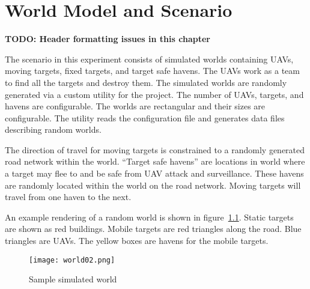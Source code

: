 \chapter{World Model and Scenario}
\label{chap:worldScenModel}
\textbf{TODO: Header formatting issues in this chapter}

The scenario in this experiment consists of simulated worlds containing UAVs, moving targets, fixed targets, and target safe havens.  The UAVs work as a team to find all the targets and destroy them.  The simulated worlds are randomly generated via a custom utility for the project.  The number of UAVs, targets, and havens are configurable.  The worlds are rectangular and their sizes are configurable.  The utility reads the configuration file and generates data files describing random worlds.  


The direction of travel for moving targets is constrained to a randomly generated road network within the world.  ``Target safe havens'' are locations in world where a target may flee to and be safe from UAV attack and surveillance.  These havens are randomly located within the world on the road network.  Moving targets will travel from one haven to the next.

An example rendering of a random world is shown in figure~\ref{fig:sample_world}. Static targets are shown as red buildings.  Mobile targets are red triangles along the road.  Blue triangles are UAVs.  The yellow boxes are havens for the mobile targets.




\begin{figure}[H]
	\centering
	\texttt{[image: world02.png]}
	\caption{Sample simulated world}
	\label{fig:sample_world}
\end{figure}

